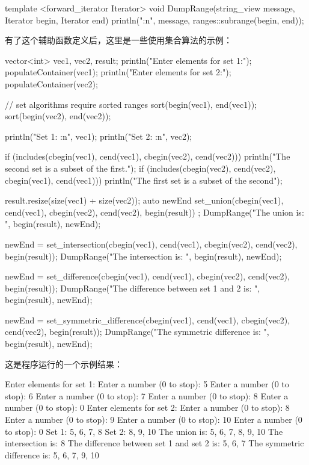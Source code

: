 \begin{cpp}
template <forward_iterator Iterator>
void DumpRange(string_view message, Iterator begin, Iterator end)
{
    println("{}{:n}", message, ranges::subrange(begin, end));
}
\end{cpp}

有了这个辅助函数定义后，这里是一些使用集合算法的示例：

\begin{cpp}
vector<int> vec1, vec2, result;
println("Enter elements for set 1:");
populateContainer(vec1);
println("Enter elements for set 2:");
populateContainer(vec2);

// set algorithms require sorted ranges
sort(begin(vec1), end(vec1));
sort(begin(vec2), end(vec2));

println("Set 1: {:n}", vec1);
println("Set 2: {:n}", vec2);

if (includes(cbegin(vec1), cend(vec1), cbegin(vec2), cend(vec2))) {
    println("The second set is a subset of the first.");
}
if (includes(cbegin(vec2), cend(vec2), cbegin(vec1), cend(vec1))) {
    println("The first set is a subset of the second");
}

result.resize(size(vec1) + size(vec2));
auto newEnd { set_union(cbegin(vec1), cend(vec1), cbegin(vec2),
    cend(vec2), begin(result)) };
DumpRange("The union is: ", begin(result), newEnd);

newEnd = set_intersection(cbegin(vec1), cend(vec1), cbegin(vec2),
cend(vec2), begin(result));
DumpRange("The intersection is: ", begin(result), newEnd);

newEnd = set_difference(cbegin(vec1), cend(vec1), cbegin(vec2),
cend(vec2), begin(result));
DumpRange("The difference between set 1 and 2 is: ", begin(result), newEnd);

newEnd = set_symmetric_difference(cbegin(vec1), cend(vec1),
cbegin(vec2), cend(vec2), begin(result));
DumpRange("The symmetric difference is: ", begin(result), newEnd);
\end{cpp}

这是程序运行的一个示例结果：

\begin{shell}
Enter elements for set 1:
Enter a number (0 to stop): 5
Enter a number (0 to stop): 6
Enter a number (0 to stop): 7
Enter a number (0 to stop): 8
Enter a number (0 to stop): 0
Enter elements for set 2:
Enter a number (0 to stop): 8
Enter a number (0 to stop): 9
Enter a number (0 to stop): 10
Enter a number (0 to stop): 0
Set 1: 5, 6, 7, 8
Set 2: 8, 9, 10
The union is: 5, 6, 7, 8, 9, 10
The intersection is: 8
The difference between set 1 and set 2 is: 5, 6, 7
The symmetric difference is: 5, 6, 7, 9, 10
\end{shell}

